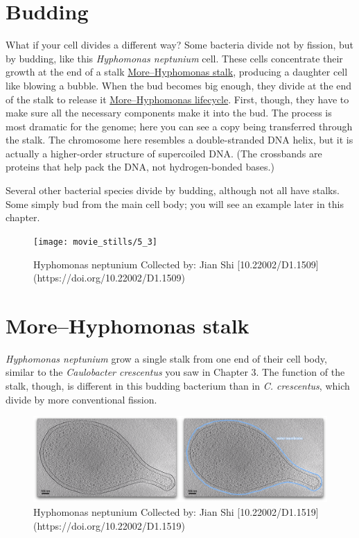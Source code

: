 \documentclass[]{tufte-book}
\begin{document}
\section{Budding}\label{budding}

What if your cell divides a different way? Some bacteria divide not by
fission, but by budding, like this \emph{Hyphomonas neptunium} cell.
These cells concentrate their growth at the end of a stalk
\protect\hyperlink{morehyphomonas-stalk}{More--Hyphomonas stalk},
producing a daughter cell like blowing a bubble. When the bud becomes
big enough, they divide at the end of the stalk to release it
\protect\hyperlink{morehyphomonas-lifecycle}{More--Hyphomonas
lifecycle}. First, though, they have to make sure all the necessary
components make it into the bud. The process is most dramatic for the
genome; here you can see a copy being transferred through the stalk. The
chromosome here resembles a double-stranded DNA helix, but it is
actually a higher-order structure of supercoiled DNA. (The crossbands
are proteins that help pack the DNA, not hydrogen-bonded bases.)

Several other bacterial species divide by budding, although not all have
stalks. Some simply bud from the main cell body; you will see an example
later in this chapter.

\begin{figure}
\texttt{[image: movie\_stills/5\_3]} \caption[Hyphomonas neptunium Collected by]{Hyphomonas neptunium Collected by: Jian Shi [10.22002/D1.1509](https://doi.org/10.22002/D1.1509)}\label{fig:unnamed-chunk-82}
\end{figure}

\hypertarget{morehyphomonas-stalk}{\section{More--Hyphomonas
stalk}\label{morehyphomonas-stalk}}

\emph{Hyphomonas neptunium} grow a single stalk from one end of their
cell body, similar to the \emph{Caulobacter crescentus} you saw in
Chapter 3. The function of the stalk, though, is different in this
budding bacterium than in \emph{C. crescentus}, which divide by more
conventional fission.

\begin{figure}
\includegraphics{movie_stills/5_3a} \caption[Hyphomonas neptunium Collected by]{Hyphomonas neptunium Collected by: Jian Shi [10.22002/D1.1519](https://doi.org/10.22002/D1.1519)}\label{fig:unnamed-chunk-83}
\end{figure}
\end{document}
